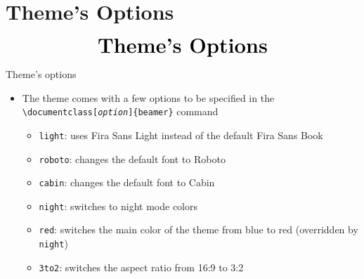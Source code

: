 \documentclass[10pt,itemsep]{beamer}
\begin{document}
\section[Options]{Theme's Options}
\begin{frame}
    \begin{eqnarray*}
        &\text{{\huge \textbf{Theme's Options}}}\\
    \end{eqnarray*}
\end{frame}
\shownotesblock{}

\begin{frame}
    {Theme's options}
    \begin{itemize}
        \item The theme comes with a few options to be specified in the \texttt{\textbackslash documentclass[\textit{option}]\{beamer\}} command
        \begin{itemize}
            \item \texttt{light}: uses Fira Sans Light instead of the default Fira Sans Book
            \item \texttt{roboto}: changes the default font to Roboto
            \item \texttt{cabin}: changes the default font to Cabin
            \item \texttt{night}: switches to night mode colors
            \item \texttt{red}: switches the main color of the theme from blue to red (overridden by \texttt{night})
            \item \texttt{3to2}: switches the aspect ratio from 16:9 to 3:2
        \end{itemize}
    \end{itemize}
\end{frame}
\shownotesblock{}
\end{document}
